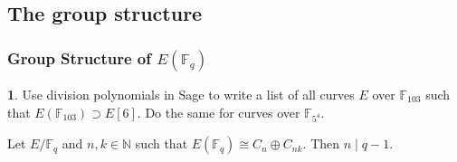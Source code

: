 \documentclass[12pt,handout]{beamer} %
\newcommand{\F}{\mathbb F}
\theoremstyle{definition}
\newtheorem{exercise}[theorem]{\translate{Exercise}}
\begin{document}
\subsection{The group structure}
\begin{frame}\frametitle{Group Structure of $E(\F_q)$}

\begin{exercise} Use division polynomials in Sage to write a list of all curves $E$ over $\F_{103}$
such that $E(\F_{103})\supset E[6]$. Do the same for curves over $\F_{5^4}$.
\end{exercise}\pause

\pause

\begin{theorem}  Let $E/\F_q$ and $n,k\in\mathbb N$ such that
$E(\F_q)\cong C_n\oplus C_{nk}.$
Then $n\mid q-1$.
\end{theorem}
\end{frame}
\end{document}
